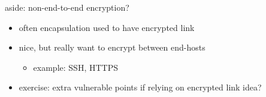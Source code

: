 \begin{frame}{aside: non-end-to-end encryption?}
    \begin{itemize}
    \item often encapsulation used to have encrypted link
    \item nice, but really want to encrypt between end-hosts
        \begin{itemize}
        \item example: SSH, HTTPS
        \end{itemize}
    \item exercise: extra vulnerable points if relying on encrypted link idea?
    \end{itemize}
\end{frame}
